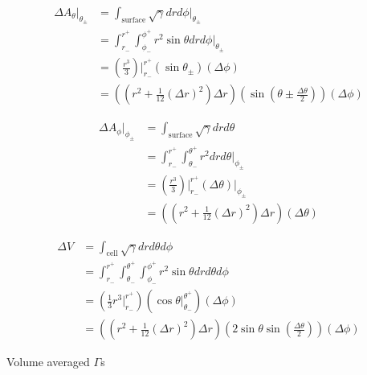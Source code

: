 \begin{align}
\Delta A_\theta \Big|_{\theta_\pm} &= \int_{\text{surface}} \sqrt{\gamma} dr d\phi  \Big|_{\theta_\pm} \\
         &= \int_{r_-}^{r^+} \int_{\phi_-}^{\phi^+} r^2 \sin \theta dr d\phi  \Big|_{\theta_\pm} \\
         &= \left( \frac{r^3}{3} \right)\Big|_{r_-}^{r^+}  \left( \sin \theta_\pm \right) \left( \Delta \phi \right)\\
         &=  \left( \left(r^2 + \frac{1}{12}\left(\Delta r\right)^2\right)\Delta r \right) \left( \sin \left( \theta \pm \frac{\Delta \theta}{2} \right) \right) \left( \Delta \phi \right)
\end{align}

\begin{align}
\Delta A_\phi \Big|_{\phi_\pm} &= \int_{\text{surface}} \sqrt{\gamma} dr d\theta \\
         &= \int_{r_-}^{r^+} \int_{\theta_-}^{\theta^+} r^2 dr d\theta  \Big|_{\phi_\pm} \\
         &= \left( \frac{r^3}{3} \right)\Big|_{r_-}^{r^+}  \left( \Delta \theta \right) \Big|_{\phi_\pm} \\
         &=  \left( \left(r^2 + \frac{1}{12}\left(\Delta r\right)^2\right)\Delta r \right) \left( \Delta \theta \right)
\end{align}

\begin{align}
\Delta V &= \int_{\text{cell}} \sqrt{\gamma} dr d\theta d\phi \\
         &= \int_{r_-}^{r^+} \int_{\theta_-}^{\theta^+} \int_{\phi_-}^{\phi^+} r^2 \sin \theta dr d\theta d\phi \\
         &= \left( \frac{1}{3} r^3 \Big|_{r_-}^{r^+} \right) \left( \cos \theta \Big|_{\theta_-}^{\theta^+} \right) \left( \Delta \phi \right)\\
         &= \left( \left(r^2 + \frac{1}{12}\left(\Delta r\right)^2\right)\Delta r \right) \left( 2 \sin \theta \sin\left(\frac{\Delta \theta}{2}\right) \right) \left( \Delta \phi \right)
\end{align}

Volume averaged $\Gamma$s

